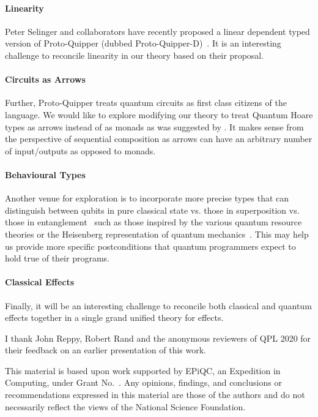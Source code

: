 \documentclass[acmsmall,nonacm,timestamp,review=false,anonymous=false]{acmart}
\newcommand{\qwire}{\ensuremath{\mathcal{Q}\textsc{wire}}\xspace}
\begin{document}
\paragraph{Linearity} Peter Selinger and collaborators have recently proposed a linear dependent typed version of Proto-Quipper (dubbed Proto-Quipper-D)~\cite{selinger2020,fu2020linear}. It is an interesting challenge to reconcile linearity in our theory based on their proposal.

\paragraph{Circuits as Arrows} Further, Proto-Quipper treats quantum circuits as first class citizens of the language. We would like to explore modifying our theory to treat Quantum Hoare types as arrows instead of as monads as was suggested by \citet{so-arrows}. It makes sense from the perspective of sequential composition as arrows can have an arbitrary number of input/outputs as opposed to monads.

\paragraph{Behavioural Types} Another venue for exploration is to incorporate more precise types that can distinguish between qubits in pure classical state vs. those in superposition vs. those in entanglement~\cite{JorrandPerdrix2009} such as those inspired by the various quantum resource theories or the Heisenberg representation of quantum mechanics~\cite{rand_type_2019,rssl20}. This may help us provide more specific postconditions that quantum programmers expect to hold true of their programs.

\paragraph{Classical Effects} Finally, it will be an interesting challenge to reconcile both classical and quantum effects together in a single grand unified theory for effects.


\begin{acks}
	I thank John Reppy, Robert Rand and the anonymous reviewers of QPL 2020 for their feedback on an earlier presentation of this work.

	This material is based upon work supported by
	EPiQC, an 
	Expedition in Computing, under Grant
	No.~.  Any opinions, findings, and
	conclusions or recommendations expressed in this material are those
	of the authors and do not necessarily reflect the views of the
	National Science Foundation.
\end{acks}
\end{document}
